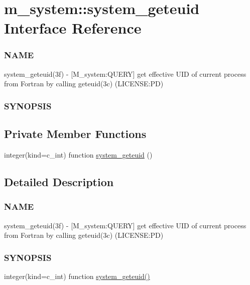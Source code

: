 \hypertarget{interfacem__system_1_1system__geteuid}{}\section{m\+\_\+system\+:\+:system\+\_\+geteuid Interface Reference}
\label{interfacem__system_1_1system__geteuid}


\subsubsection*{N\+A\+ME}

system\+\_\+geteuid(3f) -\/ \mbox{[}M\+\_\+system\+:Q\+U\+E\+RY\mbox{]} get effective U\+ID of current process from Fortran by calling geteuid(3c) (L\+I\+C\+E\+N\+SE\+:PD) \subsubsection*{S\+Y\+N\+O\+P\+S\+IS} 


\subsection*{Private Member Functions}
\begin{DoxyCompactItemize}
\item 
integer(kind=c\+\_\+int) function \mbox{\hyperlink{interfacem__system_1_1system__geteuid_af9661841f8178c662ba33a85a938183e}{system\+\_\+geteuid}} ()
\end{DoxyCompactItemize}


\subsection{Detailed Description}
\subsubsection*{N\+A\+ME}

system\+\_\+geteuid(3f) -\/ \mbox{[}M\+\_\+system\+:Q\+U\+E\+RY\mbox{]} get effective U\+ID of current process from Fortran by calling geteuid(3c) (L\+I\+C\+E\+N\+SE\+:PD) \subsubsection*{S\+Y\+N\+O\+P\+S\+IS}

integer(kind=c\+\_\+int) function \mbox{\hyperlink{interfacem__system_1_1system__geteuid_af9661841f8178c662ba33a85a938183e}{system\+\_\+geteuid()}}

